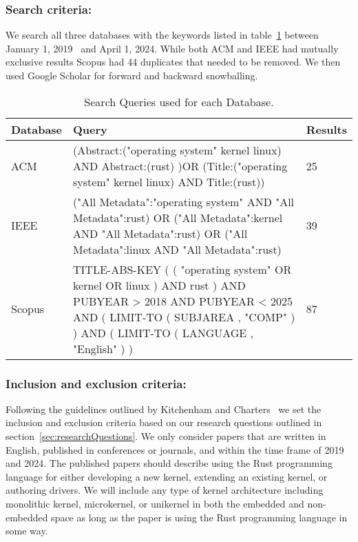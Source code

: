 \documentclass[sigconf]{acmart}
\begin{document}
\subsubsection{Search criteria:}

We search all three databases with the keywords listed in table~\ref{tab:keywords} between January
1, 2019~\cite{Gaynor2019-dk} and April 1, 2024. While both ACM and IEEE had mutually exclusive
results Scopus had 44 duplicates that needed to be removed. We then used Google Scholar for forward
and backward snowballing.

\begin{table}
\begin{tabular}{|| p{2cm}| p{4cm} | p{1cm} ||}
 \hline
 Database & Query & Results \\
 \hline\hline
 ACM  & (Abstract:("operating system" kernel linux) AND Abstract:(rust) )OR (Title:("operating
 system" kernel linux) AND Title:(rust)) & 25 \\
 IEEE & ("All Metadata":"operating system" AND "All Metadata":rust) OR ("All Metadata":kernel AND
 "All Metadata":rust) OR ("All Metadata":linux AND "All Metadata":rust) & 39 \\
 Scopus & TITLE-ABS-KEY ( ( "operating system" OR kernel OR linux ) AND rust ) AND PUBYEAR > 2018
 AND PUBYEAR < 2025 AND ( LIMIT-TO ( SUBJAREA , "COMP" ) ) AND ( LIMIT-TO ( LANGUAGE , "English" ) )
 & 87 \\
 \hline
\end{tabular}
\caption{Search Queries used for each Database.}
\label{tab:keywords}
\end{table}

\subsubsection{Inclusion and exclusion criteria:}

Following the guidelines outlined by Kitchenham and Charters~\cite{Stuart2007-cc} we set the
inclusion and exclusion criteria based on our research questions outlined in
section~\ref{sec:researchQuestions}. We only consider papers that are written in English, published
in conferences or journals, and within the time frame of 2019 and 2024. The published papers should
describe using the Rust programming language for either developing a new kernel, extending an
existing kernel, or authoring drivers. We will include any type of kernel architecture including
monolithic kernel, microkernel, or unikernel in both the embedded and non-embedded space as long as
the paper is using the Rust programming language in some way.
\end{document}
